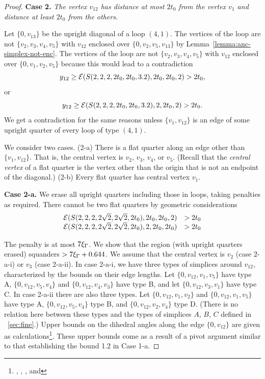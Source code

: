\begin{proof}
\medskip

{\bf Case 2.} {\it The vertex $v_{12}$ has distance at most $2t_0$
from the vertex $v_1$ and distance at least $2t_0$ from the
others.}

Let $\{0,v_{13}\}$ be the upright diagonal of a loop $(4,1)$.  The
vertices of the loop are not $\{v_2,v_3,v_4,v_5\}$ with $v_{12}$
enclosed over $\{0,v_2,v_5,v_{13}\}$ by
Lemma~\ref{lemma:anc-simplex-not-enc}. The vertices of the loop
are not $\{v_2,v_3,v_4,v_5\}$ with $v_{12}$ enclosed over
$\{0,v_1,v_2,v_5\}$ because this would lead to a contradiction
$$y_{12}\ge {\mathcal E}(S(2,2,2,2t_0,2t_0,3.2),2t_0,2t_0,2)>2t_0,$$
or
$$y_{12}\ge {\mathcal E}(S(2,2,2,2t_0,2t_0,3.2),2,2t_0,2)>2t_0.$$
We get a contradiction for the same reasons
 unless $\{v_1,v_{12}\}$ is an edge of some
upright quarter of every loop of type $(4,1)$.

We consider two cases.  (2-a) There is a flat quarter along an
edge other than $\{v_1,v_{12}\}$.  That is, the central vertex is
$v_2$, $v_3$, $v_4$, or $v_5$.  (Recall that the {\it central
vertex} of a flat quarter is the vertex other than the origin that
is not an endpoint of the diagonal.) (2-b) Every flat quarter has
central vertex $v_1$.

{\bf Case 2-a.}  We erase all upright quarters including those in
loops, taking penalties as required. There cannot be two flat
quarters by geometric considerations
$$
\begin{array}{lll}
{\mathcal E}(S(2,2,2,2\sqrt2,2\sqrt2,2t_0),2t_0,2t_0,2)&>2t_0\\
{\mathcal E}(S(2,2,2,2\sqrt2,2\sqrt2,2t_0),2,2t_0,2t_0)&>2t_0\\
\end{array}
$$

The penalty is at most $7\xi_\Gamma$.  We show that the region (with
upright quarters erased) squanders $>7\xi_\Gamma+0.644$.  We assume that
the central vertex is $v_2$ (case 2-a-i) or $v_3$ (case 2-a-ii).
In case 2-a-i, we have three types of simplices around $v_{12}$,
characterized by the bounds on their edge lengths.  Let
$\{0,v_{12},v_1,v_5\}$ have type A, $\{0,v_{12},v_5,v_4\}$ and
$\{0,v_{12},v_4,v_3\}$ have type B, and let $\{0,v_{12},v_3,v_1\}$
have type C.  In case 2-a-ii there are also three types.  Let
$\{0,v_{12},v_1,v_2\}$ and $\{0,v_{12},v_1,v_5\}$ have type A,
$\{0,v_{12},v_5,v_4\}$ type B, and $\{0,v_{12},v_2,v_4\}$ type D.
(There is no relation here between these types and the types of
simplices $A$, $B$, $C$ defined in \Chap~\ref{sec:fine}.) Upper
bounds on the dihedral angles along the edge $\{0,v_{12}\}$ are
given as calculations\footnote{, ,
, and }. These upper bounds come
as a result of a pivot argument similar to that establishing the
bound 1.2 in Case 1-a.


\end{proof}

